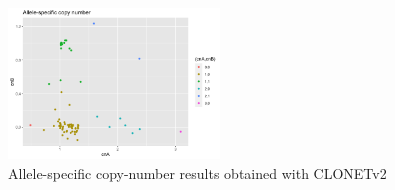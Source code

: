 \documentclass[11pt]{article}
\begin{document}
\begin{figure}[h]
   \centering
   \includegraphics[width=0.5\textwidth]{images/allele-specific-cn.png}
   \caption{\footnotesize{Allele-specific copy-number results obtained with CLONETv2}}
   \label{cn}
\end{figure}


\clearpage

\nocite{Poplin201178}

\printbibliography
\end{document}
